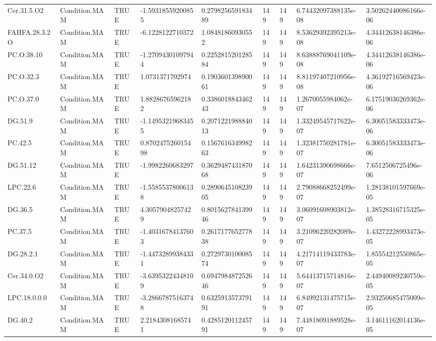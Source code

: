 \begin{longtable}{lllllllll}
Cer.31.5.O2 & Condition.MAM & TRUE & -1.59318559200855 & 0.279825659183489 & 149 & 149 & 6.74432097388135e-08 & 3.50262440086166e-06 \\
FAHFA.28.3.2O & Condition.MAM & TRUE & -6.1228122710372 & 1.08481860930552 & 149 & 149 & 8.53629392395213e-08 & 4.34412638146386e-06 \\
PC.O.38.10 & Condition.MAM & TRUE & -1.27094301097944 & 0.225281520128584 & 149 & 149 & 8.63888769041109e-08 & 4.34412638146386e-06 \\
PC.O.32.3 & Condition.MAM & TRUE & 1.0731371702974 & 0.190360139890061 & 149 & 149 & 8.81197407210956e-08 & 4.36192716569423e-06 \\
PC.O.37.0 & Condition.MAM & TRUE & 1.88286765962182 & 0.338601884346243 & 149 & 149 & 1.2670055984062e-07 & 6.17519036269362e-06 \\
DG.51.9 & Condition.MAM & TRUE & -1.14953219683455 & 0.207122198884013 & 149 & 149 & 1.33249545717622e-07 & 6.30051583333473e-06 \\
PC.42.5 & Condition.MAM & TRUE & 0.870247526015498 & 0.156761634998263 & 149 & 149 & 1.32381750281781e-07 & 6.30051583333473e-06 \\
DG.51.12 & Condition.MAM & TRUE & -1.9982260683297 & 0.362948743187068 & 149 & 149 & 1.64231390698666e-07 & 7.6512506725496e-06 \\
LPC.22.6 & Condition.MAM & TRUE & -1.55855378006138 & 0.289064510823905 & 149 & 149 & 2.79088668252499e-07 & 1.28138101597669e-05 \\
DG.36.5 & Condition.MAM & TRUE & 4.30579048257429 & 0.801562784139946 & 149 & 149 & 3.06091608903812e-07 & 1.38528316715325e-05 \\
PC.37.5 & Condition.MAM & TRUE & -1.40316784137603 & 0.261717765277838 & 149 & 149 & 3.21096220282089e-07 & 1.43272228993473e-05 \\
DG.28.2.1 & Condition.MAM & TRUE & -1.44732899384331 & 0.272973010008574 & 149 & 149 & 4.21714119433783e-07 & 1.85554212550865e-05 \\
Cer.34.0.O2 & Condition.MAM & TRUE & -3.63953224348109 & 0.694798487252646 & 149 & 149 & 5.64413715714816e-07 & 2.44940089230759e-05 \\
LPC.18.0.0.0 & Condition.MAM & TRUE & -3.28667875163748 & 0.632591357379191 & 149 & 149 & 6.84992131475715e-07 & 2.93250685475009e-05 \\
DG.40.2 & Condition.MAM & TRUE & 2.21843081685741 & 0.428512011245791 & 149 & 149 & 7.44818091889528e-07 & 3.14611162014136e-05 \\

\end{longtable}
